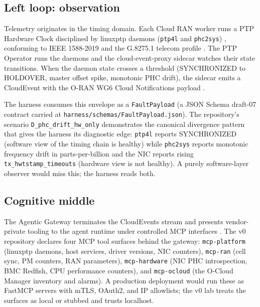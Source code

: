 \documentclass[twocolumn,10pt,a4paper]{article}
\begin{document}
\subsection{Left loop: observation}

Telemetry originates in the timing domain. Each Cloud RAN worker runs a PTP Hardware Clock disciplined by linuxptp daemons (\texttt{ptp4l} and \texttt{phc2sys}) \cite{linuxptp_ptp4l}, conforming to IEEE 1588-2019 \cite{ieee_1588_2019} and the G.8275.1 telecom profile \cite{itu_g82751}. The PTP Operator \cite{redhat_ptp_operator} runs the daemons and the cloud-event-proxy sidecar \cite{cloud_event_proxy} watches their state transitions. When the daemon state crosses a threshold (SYNCHRONIZED to HOLDOVER, master offset spike, monotonic PHC drift), the sidecar emits a CloudEvent \cite{cncf_cloudevents} with the O-RAN WG6 Cloud Notifications payload \cite{oran_cloud_notifications}.

The harness consumes this envelope as a \texttt{FaultPayload} (a JSON Schema draft-07 contract carried at \texttt{harness/schemas/FaultPayload.json}). The repository's scenario \texttt{D\_phc\_drift\_hw\_only} demonstrates the canonical divergence pattern that gives the harness its diagnostic edge: \texttt{ptp4l} reports SYNCHRONIZED (software view of the timing chain is healthy) while \texttt{phc2sys} reports monotonic frequency drift in parts-per-billion and the NIC reports rising \texttt{tx\_hwtstamp\_timeouts} (hardware view is not healthy). A purely software-layer observer would miss this; the harness reads both.

\subsection{Cognitive middle}

The Agentic Gateway terminates the CloudEvents stream and presents vendor-private tooling to the agent runtime under controlled MCP interfaces \cite{mcp_spec,mcp_python_sdk,fastmcp}. The v0 repository declares four MCP tool surfaces behind the gateway: \texttt{mcp-platform} (linuxptp daemons, host services, driver versions, NIC counters), \texttt{mcp-ran} (cell sync, PM counters, RAN parameters), \texttt{mcp-hardware} (NIC PHC introspection, BMC Redfish, CPU performance counters), and \texttt{mcp-ocloud} (the O-Cloud Manager inventory and alarms). A production deployment would run these as FastMCP servers with mTLS, OAuth2, and IP allowlists; the v0 lab treats the surfaces as local or stubbed and trusts localhost.
\end{document}
